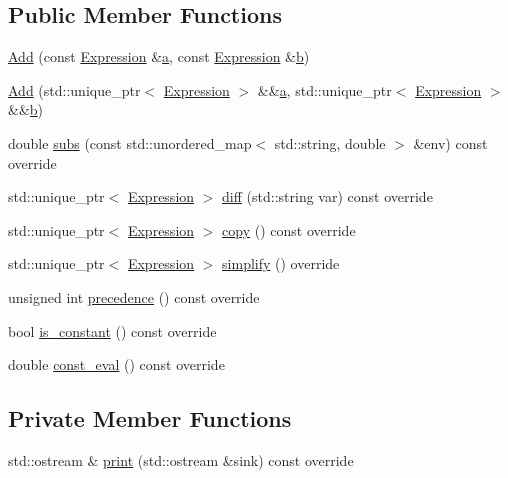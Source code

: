 \subsection*{Public Member Functions}
\begin{DoxyCompactItemize}
\item 
\hyperlink{classsymcpp_1_1Add_a037075ce08cb010b8873724279ebc9f7}{Add} (const \hyperlink{classsymcpp_1_1Expression}{Expression} \&\hyperlink{classsymcpp_1_1Add_a9c4fbbc6d99a6625e08e141d4f2bc615}{a}, const \hyperlink{classsymcpp_1_1Expression}{Expression} \&\hyperlink{classsymcpp_1_1Add_af79047cdc26b03c717544e86df5590a6}{b})
\item 
\hyperlink{classsymcpp_1_1Add_aee8c8948ed62d1d59d65053da6370caf}{Add} (std\+::unique\+\_\+ptr$<$ \hyperlink{classsymcpp_1_1Expression}{Expression} $>$ \&\&\hyperlink{classsymcpp_1_1Add_a9c4fbbc6d99a6625e08e141d4f2bc615}{a}, std\+::unique\+\_\+ptr$<$ \hyperlink{classsymcpp_1_1Expression}{Expression} $>$ \&\&\hyperlink{classsymcpp_1_1Add_af79047cdc26b03c717544e86df5590a6}{b})
\item 
double \hyperlink{classsymcpp_1_1Add_a79d0aa670728ba4a257e777ed4ac1ec0}{subs} (const std\+::unordered\+\_\+map$<$ std\+::string, double $>$ \&env) const override
\item 
std\+::unique\+\_\+ptr$<$ \hyperlink{classsymcpp_1_1Expression}{Expression} $>$ \hyperlink{classsymcpp_1_1Add_ac885da5635431d264c643618729f6cec}{diff} (std\+::string var) const override
\item 
std\+::unique\+\_\+ptr$<$ \hyperlink{classsymcpp_1_1Expression}{Expression} $>$ \hyperlink{classsymcpp_1_1Add_a58633f0c101ef1e7cc3952846054d27f}{copy} () const override
\item 
std\+::unique\+\_\+ptr$<$ \hyperlink{classsymcpp_1_1Expression}{Expression} $>$ \hyperlink{classsymcpp_1_1Add_a5a68fdd76c2206399dd5a78c4b317505}{simplify} () override
\item 
unsigned int \hyperlink{classsymcpp_1_1Add_aec3ebe2c1bde461d8bd086e9c87aeeed}{precedence} () const override
\item 
bool \hyperlink{classsymcpp_1_1Add_a6a9286402a1b24bf3a7c1ed348357875}{is\+\_\+constant} () const override
\item 
double \hyperlink{classsymcpp_1_1Add_af3e5c83af088ffc00849e852e18b055c}{const\+\_\+eval} () const override
\end{DoxyCompactItemize}
\subsection*{Private Member Functions}
\begin{DoxyCompactItemize}
\item 
std\+::ostream \& \hyperlink{classsymcpp_1_1Add_a4e73df4d72972d00ab139c5db4a93a0b}{print} (std\+::ostream \&sink) const override
\end{DoxyCompactItemize}
